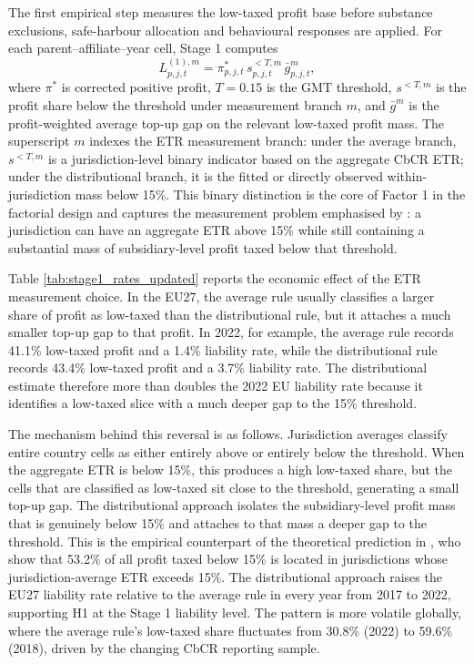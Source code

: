 \documentclass[11pt,a4paper]{article}
\begin{document}
The first empirical step measures the low-taxed profit base before substance exclusions, safe-harbour allocation and behavioural responses are applied. For each parent--affiliate--year cell, Stage 1 computes
\begin{equation}\label{eq:results_stage1_liability}
L_{p,j,t}^{(1),m}
= \pi_{p,j,t}^{*}\, s_{p,j,t}^{<T,m}\, \bar{g}_{p,j,t}^{m},
\end{equation}
where $\pi^{*}$ is corrected positive profit, $T=0.15$ is the GMT threshold, $s^{<T,m}$ is the profit share below the threshold under measurement branch $m$, and $\bar{g}^{m}$ is the profit-weighted average top-up gap on the relevant low-taxed profit mass. The superscript $m$ indexes the ETR measurement branch: under the average branch, $s^{<T,m}$ is a jurisdiction-level binary indicator based on the aggregate CbCR ETR; under the distributional branch, it is the fitted or directly observed within-jurisdiction mass below 15\%. This binary distinction is the core of Factor 1 in the factorial design and captures the measurement problem emphasised by \citet{hugger2026}: a jurisdiction can have an aggregate ETR above 15\% while still containing a substantial mass of subsidiary-level profit taxed below that threshold.



Table \ref{tab:stage1_rates_updated} reports the economic effect of the ETR measurement choice. In the EU27, the average rule usually classifies a larger share of profit as low-taxed than the distributional rule, but it attaches a much smaller top-up gap to that profit. In 2022, for example, the average rule records 41.1\% low-taxed profit and a 1.4\% liability rate, while the distributional rule records 43.4\% low-taxed profit and a 3.7\% liability rate. The distributional estimate therefore more than doubles the 2022 EU liability rate because it identifies a low-taxed slice with a much deeper gap to the 15\% threshold.

The mechanism behind this reversal is as follows. Jurisdiction averages classify entire country cells as either entirely above or entirely below the threshold. When the aggregate ETR is below 15\%, this produces a high low-taxed share, but the cells that are classified as low-taxed sit close to the threshold, generating a small top-up gap. The distributional approach isolates the subsidiary-level profit mass that is genuinely below 15\% and attaches to that mass a deeper gap to the threshold. This is the empirical counterpart of the theoretical prediction in \citet{hugger2026}, who show that 53.2\% of all profit taxed below 15\% is located in jurisdictions whose jurisdiction-average ETR exceeds 15\%. The distributional approach raises the EU27 liability rate relative to the average rule in every year from 2017 to 2022, supporting H1 at the Stage 1 liability level. The pattern is more volatile globally, where the average rule's low-taxed share fluctuates from 30.8\% (2022) to 59.6\% (2018), driven by the changing CbCR reporting sample.
\end{document}
